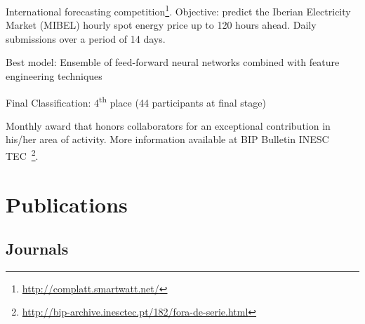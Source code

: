 \documentclass{mycv}
\begin{document}


International forecasting competition\footnote{\url{http://complatt.smartwatt.net/}}. Objective: predict the Iberian Electricity Market (MIBEL) hourly spot energy price up to 120 hours ahead. Daily submissions over a period of 14 days.


\begin{myitemize}
	\item Best model: Ensemble of feed-forward neural networks combined with feature engineering techniques
	\item Final Classification: 4\textsuperscript{th} place (44 participants at final stage)
\end{myitemize}


Monthly award that honors collaborators for an exceptional contribution in his/her area of activity. More information available at BIP Bulletin INESC TEC~\footnote{\url{http://bip-archive.inesctec.pt/182/fora-de-serie.html}}.



\pagebreak


\vspace{0.3cm}

\section{Publications}


\subsection{Journals}
\end{document}
